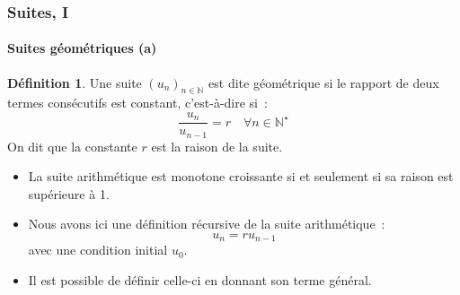 \documentclass[10pt,notheorems]{beamer}
\theoremstyle{plain}
\theoremstyle{definition} %
\newtheorem{definition}{Définition}
\begin{document}
\begin{frame}
  \frametitle{Suites, I}
  \framesubtitle{Suites géométriques (a)}
  \hypertarget{slide_suites_geometrique_1}{}

  \bigskip

  \begin{definition}
    Une suite $(u_n)_{n\in\mathbb N}$ est dite géométrique si le rapport de deux termes consécutifs est constant, c'est-à-dire si~:
    \[
      \frac{u_n}{u_{n-1}} = r\quad \forall n\in\mathbb N^{\star}
    \]
    On dit que la constante $r$ est la raison de la suite.
  \end{definition}

  \bigskip

  \begin{itemize}

  \item La suite arithmétique est monotone croissante si et seulement si sa raison est supérieure à 1.\newline

  \item Nous avons ici une définition récursive de la suite arithmétique~:
    \[
      u_n = r u_{n-1}
    \]
    avec une condition initial $u_0$.\newline

  \item Il est possible de définir celle-ci en donnant son terme général.\newline

  \end{itemize}

\end{frame}
\end{document}
